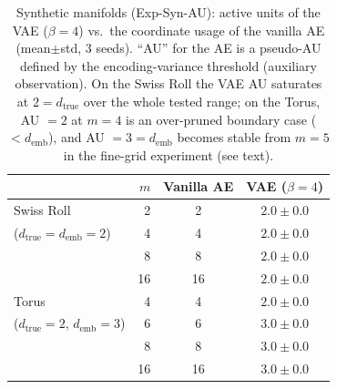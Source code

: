 \documentclass[make,article,submit,pdftex,moreauthors]{Definitions/mdpi}
\newcommand{\dtrue}{d_{\mathrm{true}}}
\newcommand{\demb}{d_{\mathrm{emb}}}
\begin{document}
\begin{table}[H]
\caption{Synthetic manifolds (Exp-Syn-AU): active units of the VAE
($\beta = 4$) vs.\ the coordinate usage of the vanilla AE (mean$\pm$std,
3 seeds). ``AU'' for the AE is a pseudo-AU defined by the encoding-variance
threshold (auxiliary observation).
On the Swiss Roll the VAE AU saturates at $2 = \dtrue$ over the whole
tested range; on the Torus, AU $= 2$ at $m = 4$ is an over-pruned boundary
case ($< \demb$), and AU $= 3 = \demb$ becomes stable from $m = 5$ in the
fine-grid experiment (see text).}
\label{tab:ea}
\small
\begin{tabular}{lrcc}
\toprule
 & $m$ & \textbf{Vanilla AE} & \textbf{VAE ($\beta = 4$)} \\
\midrule
Swiss Roll & 2 & 2 & $2.0 \pm 0.0$ \\
($\dtrue = \demb = 2$) & 4 & 4 & $2.0 \pm 0.0$ \\
 & 8 & 8 & $2.0 \pm 0.0$ \\
 & 16 & 16 & $2.0 \pm 0.0$ \\
\midrule
Torus & 4 & 4 & $2.0 \pm 0.0$ \\
($\dtrue = 2$, $\demb = 3$) & 6 & 6 & $3.0 \pm 0.0$ \\
 & 8 & 8 & $3.0 \pm 0.0$ \\
 & 16 & 16 & $3.0 \pm 0.0$ \\
\bottomrule
\end{tabular}
\end{table}
\end{document}
